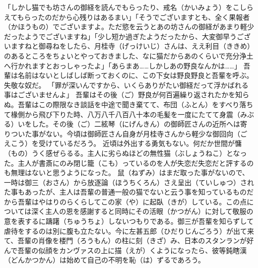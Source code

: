 \documentclass{book}
\begin{document}
「しかし猫でも坊さんの御経を読んでもらったり、戒名（かいみょう）をこしらえてもらったのだから心残りはあるまい」「そうでございますとも、全く果報者（かほうもの）でございますよ。ただ慾を云うとあの坊さんの御経があまり軽少だったようでございますね」「少し短か過ぎたようだったから、大変御早うございますねと御尋ねをしたら、月桂寺（げっけいじ）さんは、ええ利目（ききめ）のあるところをちょいとやっておきました、なに猫だからあのくらいで充分浄土へ行かれますとおっしゃったよ」「あらまあ\ldots{}\ldots{}しかしあの野良なんかは\ldots{}\ldots{}」
吾輩は名前はないとしばしば断っておくのに、この下女は野良野良と吾輩を呼ぶ。失敬な奴だ。
「罪が深いんですから、いくらありがたい御経だって浮かばれる事はございませんよ」
吾輩はその後（ご）野良が何百遍繰り返されたかを知らぬ。吾輩はこの際限なき談話を中途で聞き棄てて、布団（ふとん）をすべり落ちて椽側から飛び下りた時、八万八千八百八十本の毛髪を一度にたてて身震（みぶる）いをした。その後（ご）二絃琴（にげんきん）の御師匠さんの近所へは寄りついた事がない。今頃は御師匠さん自身が月桂寺さんから軽少な御回向（ごえこう）を受けているだろう。
近頃は外出する勇気もない。何だか世間が慵（もの）うく感ぜらるる。主人に劣らぬほどの無性猫（ぶしょうねこ）となった。主人が書斎にのみ閉じ籠（こも）っているのを人が失恋だ失恋だと評するのも無理はないと思うようになった。
鼠（ねずみ）はまだ取った事がないので、一時は御三（おさん）から放逐論（ほうちくろん）さえ呈出（ていしゅつ）された事もあったが、主人は吾輩の普通一般の猫でないと云う事を知っているものだから吾輩はやはりのらくらしてこの家（や）に起臥（きが）している。この点については深く主人の恩を感謝すると同時にその活眼（かつがん）に対して敬服の意を表するに躊躇（ちゅうちょ）しないつもりである。御三が吾輩を知らずして虐待をするのは別に腹も立たない。今に左甚五郎（ひだりじんごろう）が出て来て、吾輩の肖像を楼門（ろうもん）の柱に刻（きざ）み、日本のスタンランが好んで吾輩の似顔をカンヴァスの上に描（えが）くようになったら、彼等鈍瞎漢（どんかつかん）は始めて自己の不明を恥（は）ずるであろう。
\end{document}
